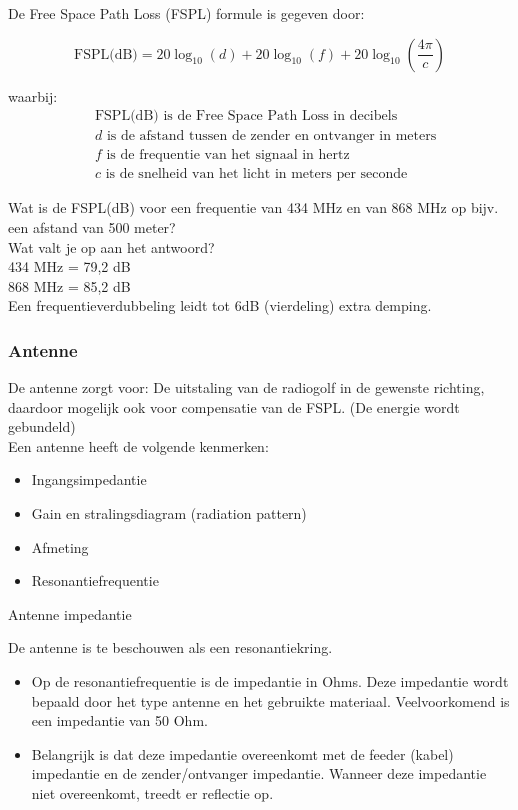 De Free Space Path Loss (FSPL) formule is gegeven door:

\begin{equation}
\text{FSPL(dB)} = 20 \log_{10}(d) + 20 \log_{10}(f) + 20 \log_{10}\left(\frac{4\pi}{c}\right)
\end{equation}

waarbij:
\begin{align*}
&\text{FSPL(dB)} \text{ is de Free Space Path Loss in decibels} \\
&d \text{ is de afstand tussen de zender en ontvanger in meters} \\
&f \text{ is de frequentie van het signaal in hertz} \\
&c \text{ is de snelheid van het licht in meters per seconde}
\end{align*}

Wat is de FSPL(dB) voor een frequentie van 434 MHz en van 868 MHz op bijv. een afstand van 500 meter?\\
Wat valt je op aan het antwoord?\\
434 MHz = 79,2 dB\\
868 MHz = 85,2 dB\\
Een frequentieverdubbeling leidt tot 6dB (vierdeling) extra demping.

\subsubsection{Antenne}
De antenne zorgt voor: De uitstaling van de radiogolf in de gewenste richting, daardoor mogelijk ook voor compensatie van de FSPL. (De energie wordt gebundeld)\\

Een antenne heeft de volgende kenmerken:
\begin{itemize}
  \item Ingangsimpedantie
  \item Gain en stralingsdiagram (radiation pattern)
  \item Afmeting
  \item Resonantiefrequentie
\end{itemize}

Antenne impedantie

De antenne is te beschouwen als een resonantiekring.
\begin{itemize}
  \item Op de resonantiefrequentie is de impedantie in Ohms. Deze impedantie wordt bepaald door het type antenne en het gebruikte materiaal. Veelvoorkomend is een impedantie van 50 Ohm.
  \item Belangrijk is dat deze impedantie overeenkomt met de feeder (kabel) impedantie en de zender/ontvanger impedantie. Wanneer deze impedantie niet overeenkomt, treedt er reflectie op.
\end{itemize}

